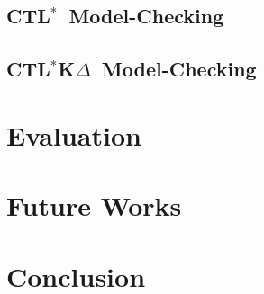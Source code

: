 \documentclass{acmart}
\def\ctls{CTL$^{*}$}
\def\ctlskd{CTL$^{*}$K$\Delta$}
\begin{document}
\subsection{\ctls\ Model-Checking}

\subsection{\ctlskd\ Model-Checking}


\section{Evaluation}

\section{Future Works}

\section{Conclusion}
\end{document}
